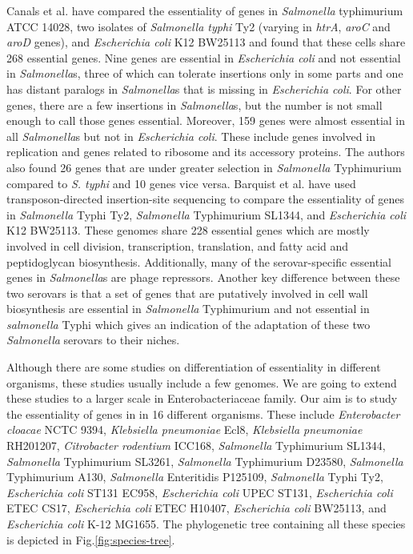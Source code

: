 \documentclass[12pt,letterpaper]{article}
\begin{document}
Canals et al.\@ \cite{canals_high-throughput_2012} have compared the essentiality of genes in \textit{Salmonella} typhimurium ATCC 14028, two isolates of \textit{Salmonella typhi} Ty2 (varying in \textit{htrA}, \textit{aroC} and \textit{aroD} genes), and \textit{Escherichia coli} K12 BW25113 and found that these cells share 268 essential genes. Nine genes are essential in \textit{Escherichia coli} and not essential in \textit{Salmonella}s, three of which can tolerate insertions only in some parts and one has distant paralogs in \textit{Salmonella}s that is missing in \textit{Escherichia coli}. For other genes, there are a few insertions in \textit{Salmonella}s, but the number is not small enough to call those genes essential. Moreover, 159 genes were almost essential in all \textit{Salmonella}s but not in \textit{Escherichia coli}. These include genes involved in replication and genes related to ribosome and its accessory proteins. The authors also found 26 genes that are under greater selection in \textit{Salmonella} Typhimurium compared to \textit{S. typhi} and 10 genes vice versa. Barquist et al. \cite{barquist_comparison_2013} have used transposon-directed insertion-site sequencing to compare the essentiality of genes in \textit{Salmonella} Typhi Ty2, \textit{Salmonella} Typhimurium SL1344, and \textit{Escherichia coli} K12 BW25113. 
These genomes share 228 essential genes which are mostly involved in cell division, transcription, translation, and fatty acid and peptidoglycan biosynthesis. Additionally, many of the serovar-specific essential genes in \textit{Salmonella}s are phage repressors. Another key difference between these two serovars is that a set of genes that are putatively involved in cell wall biosynthesis are essential in \textit{Salmonella} Typhimurium and not essential in \textit{salmonella} Typhi which gives an indication of the adaptation of these two \textit{Salmonella} serovars to their niches.

Although there are some studies on differentiation of essentiality in different organisms, these studies usually include a few genomes. We are going to extend these studies to a larger scale in Enterobacteriaceae family. Our aim is to study the essentiality of genes in in 16 different organisms. These include \textit{Enterobacter cloacae} NCTC 9394, \textit{Klebsiella pneumoniae} Ecl8, \textit{Klebsiella pneumoniae} RH201207, \textit{Citrobacter rodentium} ICC168, \textit{Salmonella} Typhimurium SL1344, \textit{Salmonella} Typhimurium SL3261, \textit{Salmonella} Typhimurium D23580, \textit{Salmonella} Typhimurium A130, \textit{Salmonella} Enteritidis P125109, \textit{Salmonella} Typhi Ty2, \textit{Escherichia coli} ST131 EC958, \textit{Escherichia coli} UPEC ST131, \textit{Escherichia coli} ETEC CS17, \textit{Escherichia coli} ETEC H10407, \textit{Escherichia coli} BW25113, and \textit{Escherichia coli} K-12 MG1655. The phylogenetic tree containing all these species is depicted in Fig.\@ \ref{fig:species-tree}.
\end{document}
